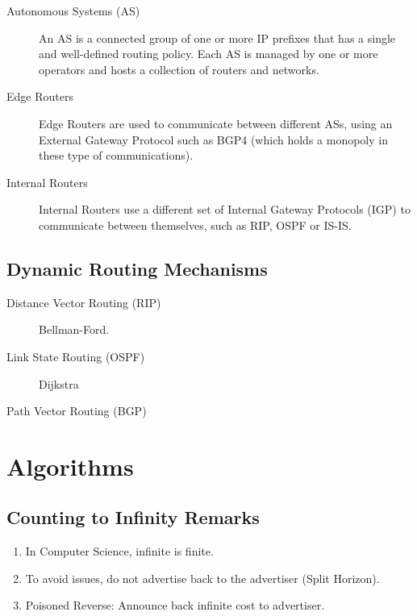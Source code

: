 \documentclass{article}
\begin{document}
\begin{description}
   	\item[Autonomous Systems (AS)] An AS is a connected group of one or more IP prefixes that has a single and well-defined routing policy. Each AS is managed by one or more operators and hosts a collection of routers and networks.
   	\item[Edge Routers] Edge Routers are used to communicate between different ASs, using an External Gateway Protocol such as BGP4 (which holds a monopoly in these type of communications).
   	\item[Internal Routers] Internal Routers use a different set of Internal Gateway Protocols (IGP) to communicate between themselves, such as RIP, OSPF or IS-IS.
\end{description}


\subsection{Dynamic Routing Mechanisms}

\begin{description}
   	\item[Distance Vector Routing (RIP)] Bellman-Ford.
   	\item[Link State Routing (OSPF)] Dijkstra
   	\item[Path Vector Routing (BGP)] 
\end{description}




\newpage

\section{Algorithms}



\subsection{Counting to Infinity Remarks}

\begin{enumerate}
   	\item In Computer Science, infinite is finite.
   	\item To avoid issues, do not advertise back to the advertiser (Split Horizon).
   	\item Poisoned Reverse: Announce back infinite cost to advertiser.
\end{enumerate}
\end{document}
